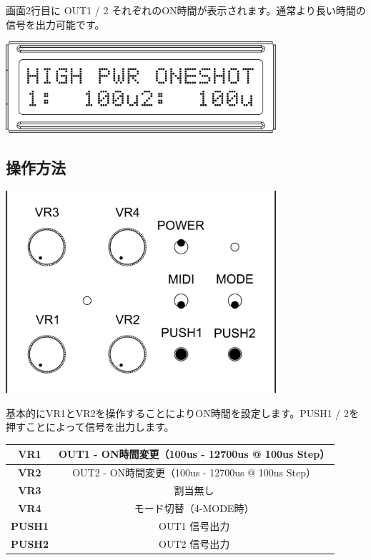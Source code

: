 \documentclass[a4paper,11pt]{jsarticle}
\begin{document}
画面2行目に OUT1 / 2 それぞれのON時間が表示されます。通常より長い時間の信号を出力可能です。

\vspace*{5mm}
\begin{center}
\includegraphics[width=100mm]{image/Arduino_Interrupter_v1_LCD_HPOS.png}
\end{center}
\vspace*{5mm}


\subsection{操作方法}

\vspace*{5mm}
\begin{center}
\includegraphics[width=100mm]{image/Arduino_Interrupter_v1_Design_Interrupter.png}
\end{center}
\vspace*{5mm}

基本的にVR1とVR2を操作することによりON時間を設定します。PUSH1 / 2を押すことによって信号を出力します。

\vspace*{5mm}

\begin{table}[htbp]
\begin{center}
\begin{tabular}{ | c | c | }
\hline
\textbf{VR1} & OUT1 - ON時間変更（100us - 12700us @ 100us Step） \\\hline
\textbf{VR2} & OUT2 - ON時間変更（100us - 12700us @ 100us Step） \\\hline
\textbf{VR3} & 割当無し \\\hline
\textbf{VR4} & モード切替（4-MODE時） \\\hline
\textbf{PUSH1} & OUT1 信号出力 \\\hline
\textbf{PUSH2} & OUT2 信号出力 \\\hline
\end{tabular}
\end{center}
\end{table}
\end{document}
